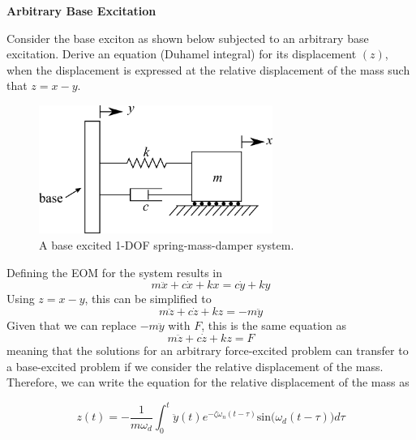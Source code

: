 \documentclass[12pt,letter]{article}
\begin{document}
\begin{example}
	\textbf{Arbitrary Base Excitation}

	\noindent Consider the base exciton as shown below subjected to an arbitrary base excitation. Derive an equation (Duhamel integral) for its displacement $(z)$, when the displacement is expressed at the relative displacement of the mass such that $z = x - y$. 
	
	\begin{figure}[H]
		\centering
		\includegraphics[width=3in]{../figures/1_DOF_spring_dashpot_mass_horizontal_base_excited.png}
		\caption{A base excited 1-DOF spring-mass-damper system.}
	\end{figure}
	
	Defining the EOM for the system results in
	\begin{equation}
		m\ddot{x} + c\dot{x} + kx = c\dot{y} + ky 
	\end{equation} 	
	Using $z = x - y$, this can be simplified to
	\begin{equation}
		m\ddot{z} + c \dot{z} + kz = -m\ddot{y}
	\end{equation} 	
	Given that we can replace $-m\ddot{y}$ with $F$, this is the same equation as
	\begin{equation}
		m\ddot{z} + c \dot{z} + kz = F
	\end{equation} 	
	meaning that the solutions for an arbitrary force-excited problem can transfer to a base-excited problem if we consider the relative displacement of the mass. Therefore, we can write the equation for the relative displacement of the mass as
	
	\begin{equation}
		z(t) = -\frac{1}{m \omega_d} \int_{0}^{t} \ddot{y}(t) e^{-\zeta \omega_n (t-\tau)} \text{sin}\big(\omega_d(t-\tau)\big) d \tau	
	\end{equation}
	
\end{example}

\end{document}
